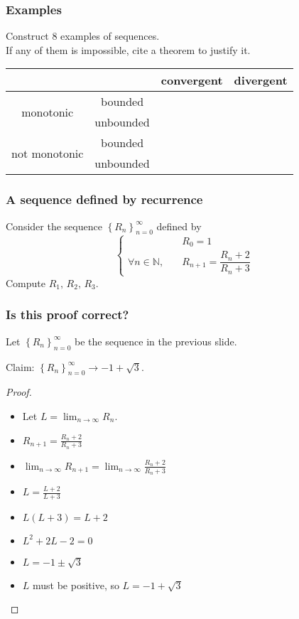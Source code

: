\documentclass[14pt]{beamer}
\newcommand {\DS} [1] {${\displaystyle #1}$}
\newcommand {\N}{\mathbb{N}}
\newcommand{\setsize}[1]{\fontsize{#1}{#1}\selectfont} %
\newcommand{\smallerfont}{\setsize{13}} %
\newcommand{\Rn}{\left\{ R_n \right\}_{n=0}^{\infty}}
\newcommand{\tasma}{\phantom{\DS{\int_{\dfrac 11}^9} ????????  }}
\begin{document}
\begin{frame}[t]
\smallerfont
\frametitle{Examples}

Construct 8 examples of sequences. \\
If any of them is impossible, cite a theorem to justify it.

\begin{center}
\begin{tabular}{|c|c|c|c|}
\hline
&& convergent & divergent \\
\hline
\multirow{2}{*}{monotonic} & bounded & \tasma & \tasma \\ 
\cline{2-4}
& unbounded & \tasma & \tasma  \\
\hline
\multirow{2}{*}{not monotonic} & bounded & \tasma & \tasma  \\
\cline{2-4}
& unbounded &\tasma & \tasma \\
\hline
\end{tabular}
\end{center}


\end{frame}
\begin{frame}[t]
\frametitle{A sequence defined by recurrence}

Consider the sequence \DS{\Rn} defined by
	\begin{equation*}
		\begin{cases}
			&R_0 = 1 \\
			 \forall n \in \N, \quad & R_{n+1} = \dfrac{ R_n + 2}{R_n + 3}
		\end{cases}
	\end{equation*}
Compute \DS{R_1, \, R_2, \, R_3}.

\end{frame}
\begin{frame}[t]
\smallerfont
\frametitle{Is this proof correct?}
Let  \DS{\Rn} be the sequence in the previous slide.
\begin{block}{Claim:}
	\DS{\Rn \longrightarrow -1 + \sqrt{3} }.
\end{block}
\pause
\begin{proof}
\begin{multicols}{2}
	\begin{itemize}
		\item  Let \DS{L = \lim_{n \to \infty} R_n}.
		\item \DS{R_{n+1} = \frac{R_n + 2}{ R_n + 3}}
		\item \DS{\lim_{n \to \infty }R_{n+1} = \lim_{n \to \infty }\frac{R_n + 2}{ R_n + 3}}
		\item \DS{L = \frac{L + 2}{ L + 3}}
		\item \DS{L(L+3) = L + 2 }
		\item \DS{L^2 +2L - 2 = 0 }
		\item \DS{L =   -1 \pm \sqrt{3}}
		\item \DS{L} must be positive, so \DS{L =  -1 + \sqrt{3} }
	\end{itemize}
\end{multicols}
\end{proof}

\end{frame}
\end{document}

